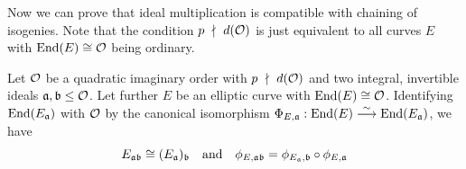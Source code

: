 Now we can prove that ideal multiplication is compatible with chaining of isogenies.
Note that the condition $p \ \nmid \  d(\mathcal{O})$ is just equivalent to all curves $E$ with $\mathrm{End}(E) \cong \mathcal{O}$ being ordinary.
\begin{lemma}
    Let $\mathcal{O}$ be a quadratic imaginary order with $p \ \nmid \  d(\mathcal{O})$ and two integral, invertible ideals $\mathfrak{a}, \mathfrak{b} \leq \mathcal{O}$.
    Let further $E$ be an elliptic curve with $\mathrm{End}(E) \cong \mathcal{O}$.
    Identifying $\mathrm{End}(E_{\mathfrak{a}})$ with $\mathcal{O}$ by the canonical isomorphism $\Phi_{E, \mathfrak{a}}: \mathrm{End}(E) \overset{\sim}{\longrightarrow} \mathrm{End}(E_{\mathfrak{a}})$, we have
    \begin{equation*}
        E_{\mathfrak{a}\mathfrak{b}} \cong (E_{\mathfrak{a}})_{\mathfrak{b}} \quad \text{and} \quad \phi_{E, \mathfrak{a}\mathfrak{b}} = \phi_{E_{\mathfrak{a}}, \mathfrak{b}} \circ \phi_{E, \mathfrak{a}}
    \end{equation*}
\end{lemma}
